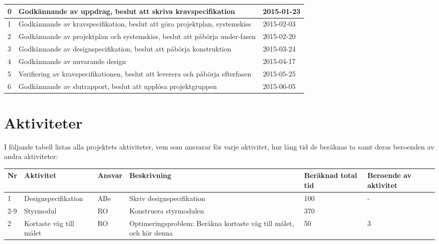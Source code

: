 \documentclass[11pt]{article}
\begin{document}
\begin{flushleft}
\begin{table}[h]
\begin{tabular}{|l|p{.75\linewidth}|l|}
0 &
Godkännande av uppdrag, beslut att skriva kravspecifikation &
2015-01-23 \\ \hline
1 &
Godkännande av kravspecifikation, beslut att göra projektplan, systemskiss &
2015-02-03 \\ \hline
2 &
Godkännande av projektplan och systemskiss, beslut att påbörja under-fasen &
2015-02-20 \\ \hline
3 &
Godkännande av designspecifikation, beslut att påbörja konstruktion &
2015-03-24 \\ \hline
4 &
Godkännande av nuvarande design &
2015-04-17 \\ \hline
5 &
Verifiering av kravspecifikationen, beslut att leverera och påbörja efterfasen &
2015-05-25 \\ \hline
6 &
Godkännande av slutrapport, beslut att upplösa projektgruppen &
2015-06-05 \\ \hline
 
\end{tabular}
\end{table}

\pagebreak

\section{Aktiviteter}
I följande tabell listas alla projektets aktiviteter, vem som ansvarar för varje aktivitet, hur lång tid de beräknas ta samt deras beroenden av andra aktiviteter:

\begin{longtable}{|l|p{.20\linewidth}|l|p{.30\linewidth}|p{.10\linewidth}|p{.10\linewidth}|} \hline

Nr & 
Aktivitet & 
Ansvar & 
Beskrivning & 
Beräknad total tid &
Beroende av aktivitet \\[0.1in] \hline


%
% 
 
1 &
Designspecifikation &
ABe &
Skriv designspecifikation &
100 &
- \\ \hline
 
2-9 &
Styrmodul &
RO &
Konstruera styrmodulen &
370 &
 \\ \hline

2 &
Kortaste väg till målet &
RO &
Optimeringsproblem: Beräkna kortaste väg till målet, och kör denna &
50 &
3 \\ \hline
 

\end{longtable}
\end{flushleft}
\end{document}
